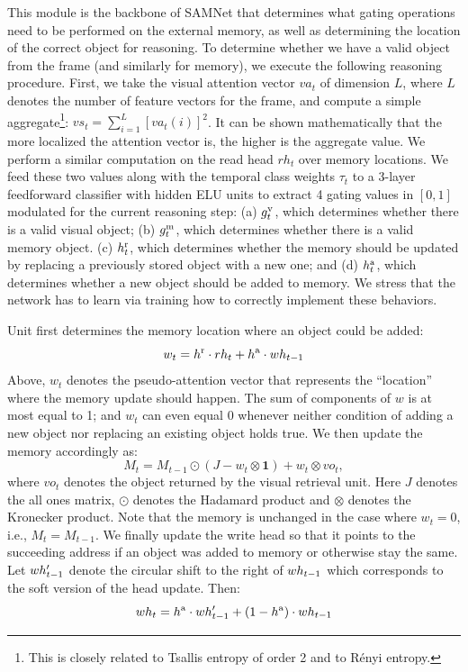 This module is the backbone of SAMNet that determines what gating operations need to be performed on the external memory, as well as
determining the location of the correct object for reasoning.
To determine whether we have a valid object from the frame (and similarly for memory), we execute the following reasoning procedure.
First, we take the visual attention vector $va_t$ of dimension $L$, where $L$ denotes the number of feature vectors for the frame,
and compute a simple aggregate\footnote{%
	This is closely related to Tsallis entropy of order 2 and to R\'{e}nyi entropy.}: %
$vs_t = \sum_{i=1}^L [va_t(i)]^2$. It can be shown mathematically that the more localized the attention
vector is, the higher is the aggregate value.
We perform a similar computation on the read head $rh_t$ over memory locations.
We feed these two values along with the temporal class weights $\tau_t$ to a 3-layer feedforward classifier with hidden ELU units to extract 4 gating values
in $[0,1]$ modulated for the current reasoning step:
(a) $g^{\mathrm{v}}_t$, which determines whether there is a valid visual object;
(b) $g^{\mathrm{m}}_t$, which determines whether there is a valid memory object. 
(c) $h^{\mathrm{r}}_t$, which determines whether the memory should be updated by replacing a previously stored object with a new one; and
(d) $h^{\mathrm{a}}_t$, which determines whether a new object should be added to memory.
We stress that the network has to learn via training how to correctly implement these behaviors.

Unit first determines the memory location where an object could be added:
\[ w_t = h^{\mathrm{r}} \cdot rh_t + h^{\mathrm{a}} \cdot wh_{t-1} \]
Above, $w_t$ denotes the pseudo-attention vector that represents the ``location'' where the memory update should happen.
The sum of components of $w$ is at most equal to 1; and $w_t$ can even equal 0 whenever neither condition
of adding a new object nor replacing an existing object holds true.
We then update the memory accordingly as:
\[ M_t = M_{t-1} \odot (J - w_t \otimes \mathbf{1}) + w_t \otimes vo_t,\]
where $vo_t$ denotes the object returned by the visual retrieval unit. 
Here $J$ denotes the all ones matrix, $\odot$ denotes the Hadamard product and $\otimes$ denotes the Kronecker product. 
Note that the memory is unchanged in the case where $w_t = 0$, i.e., $M_t = M_{t-1}$.
We finally update the write head so that it points to the succeeding address if an object was added to memory or otherwise stay the same.
Let $wh'_{t-1}$ denote the circular shift to the right of $wh_{t-1}$ which corresponds to the soft version of the head update.
Then:
\[ wh_t = h^{\mathrm{a}} \cdot wh'_{t-1} + (1-h^{\mathrm{a}}) \cdot wh_{t-1} \]

